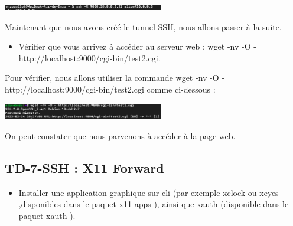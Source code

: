 \documentclass[12pt]{article}
\begin{document}
\vspace{0.3cm}

\begin{center}
  \includegraphics[width=7cm]{Images-Client-SSH/Image-TD-SSH-6/tunnel-ssh.png}
\end{center}

\vspace{0.3cm}

Maintenant que nous avons créé le tunnel SSH, nous allons passer à la suite.

\vspace{0.3cm}

\begin{itemize}
  \item Vérifier que vous arrivez à accéder au serveur web : wget -nv -O - http://localhost:9000/cgi-bin/test2.cgi.
\end{itemize}

\vspace{0.3cm}

Pour vérifier, nous allons utiliser la commande wget -nv -O - http://localhost:9000/cgi-bin/test2.cgi comme ci-dessous :

\vspace{0.3cm}

\begin{center}
  \includegraphics[width=7cm]{Images-Client-SSH/Image-TD-SSH-6/commande-wget.png}
\end{center}

\vspace{0.3cm}

On peut constater que nous parvenons à accéder à la page web.

\vspace{0.3cm}

\newpage

\subsection{TD-7-SSH : X11 Forward}

\vspace{0.3cm}

\begin{itemize}
  \item Installer une application graphique sur cli (par exemple xclock ou xeyes ,disponibles dans le paquet x11-apps ), ainsi que xauth (disponible dans le paquet xauth ).
\end{itemize}
\end{document}
